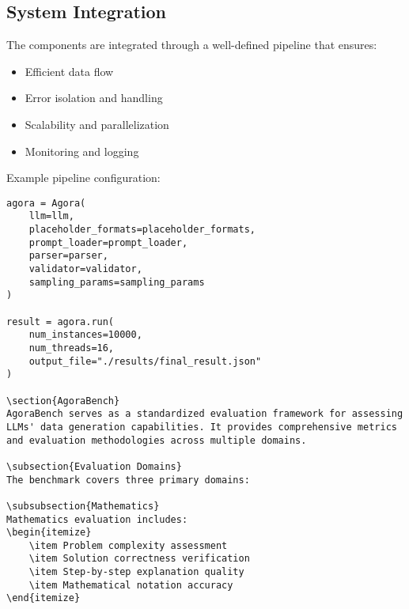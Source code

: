 \documentclass[10pt,conference]{IEEEtran}
\begin{document}
\subsection{System Integration}
The components are integrated through a well-defined pipeline that ensures:
\begin{itemize}
    \item Efficient data flow
    \item Error isolation and handling
    \item Scalability and parallelization
    \item Monitoring and logging
\end{itemize}

Example pipeline configuration:

\begin{lstlisting}
agora = Agora(
    llm=llm,
    placeholder_formats=placeholder_formats,
    prompt_loader=prompt_loader,
    parser=parser,
    validator=validator,
    sampling_params=sampling_params
)

result = agora.run(
    num_instances=10000,
    num_threads=16,
    output_file="./results/final_result.json"
)

\section{AgoraBench}
AgoraBench serves as a standardized evaluation framework for assessing LLMs' data generation capabilities. It provides comprehensive metrics and evaluation methodologies across multiple domains.

\subsection{Evaluation Domains}
The benchmark covers three primary domains:

\subsubsection{Mathematics}
Mathematics evaluation includes:
\begin{itemize}
    \item Problem complexity assessment
    \item Solution correctness verification
    \item Step-by-step explanation quality
    \item Mathematical notation accuracy
\end{itemize}


\end{lstlisting}
\end{document}
